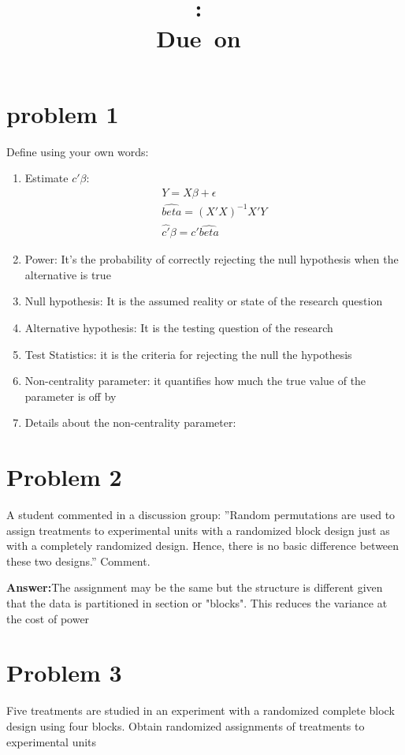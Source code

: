 \documentclass{article}
\title{
	\vspace{2in}
	\textmd{\textbf{\hmwkClass:\ \hmwkTitle}}\\
	\normalsize\vspace{0.1in}\small{Due\ on\ \hmwkDueDate}\\
	\vspace{0.1in}\large{\textit{\hmwkClassInstructor}}
	\vspace{3in}
}
\author{\hmwkAuthorName}
\date{}
\begin{document}
\maketitle
\pagebreak
\tableofcontents
\pagebreak

\section{problem 1}
Define using your own words:
\begin{enumerate}
	\item Estimate $c'\beta$:
	      \[
		      \begin{split}
			      Y = X\beta + \epsilon      \\
			      \hat{beta} = (X'X)^{-1}X'Y \\
			      \hat{c'}\beta = c'\hat{beta}
		      \end{split}
	      \]
	\item Power: It's the probability of correctly rejecting the null hypothesis when the alternative is true
	\item Null hypothesis: It is the assumed reality or state of the research question
	\item Alternative hypothesis: It is the testing question of the research
	\item Test Statistics: it is the criteria for rejecting the null the hypothesis
	\item Non-centrality parameter: it quantifies how much the true value of the parameter is off by
	\item Details about the non-centrality parameter:
\end{enumerate}

\section{Problem 2}
A student commented in a discussion group: ”Random permutations are used to assign treatments
to experimental units with a randomized block design just as with a completely randomized design.
Hence, there is no basic difference between these two designs.” Comment.

\textbf{Answer:}The assignment may be the same but the structure is different given that the data is partitioned
in section or "blocks". This reduces the variance at the cost of power

\section{Problem 3}
Five treatments are studied in an experiment with a randomized complete block design using four
blocks. Obtain randomized assignments of treatments to experimental units
\end{document}
